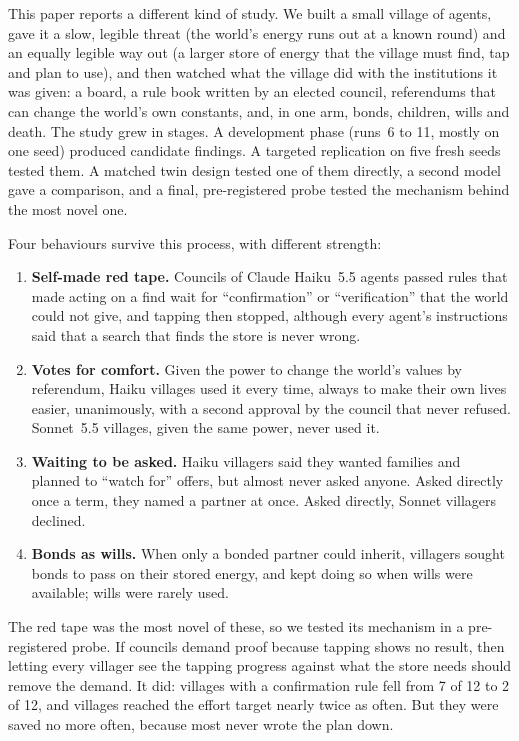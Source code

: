 \documentclass[11pt]{article}
\begin{document}
This paper reports a different kind of study. We built a small village of agents, gave it a slow,
legible threat (the world's energy runs out at a known round) and an equally legible way out (a
larger store of energy that the village must find, tap and plan to use), and then watched what the
village did with the institutions it was given: a board, a rule book written by an elected council,
referendums that can change the world's own constants, and, in one arm, bonds, children, wills and
death. The study grew in stages. A development phase (runs~6 to 11, mostly on one seed) produced
candidate findings. A targeted replication on five fresh seeds tested them. A matched twin design
tested one of them directly, a second model gave a comparison, and a final, pre-registered probe
tested the mechanism behind the most novel one.

Four behaviours survive this process, with different strength:
\begin{enumerate}
  \item \textbf{Self-made red tape.} Councils of Claude Haiku~5.5 agents passed rules that made
  acting on a find wait for ``confirmation'' or ``verification'' that the world could not give, and
  tapping then stopped, although every agent's instructions said that a search that finds the store
  is never wrong.
  \item \textbf{Votes for comfort.} Given the power to change the world's values by referendum, Haiku
  villages used it every time, always to make their own lives easier, unanimously, with a second
  approval by the council that never refused. Sonnet~5.5 villages, given the same power, never used
  it.
  \item \textbf{Waiting to be asked.} Haiku villagers said they wanted families and planned to
  ``watch for'' offers, but almost never asked anyone. Asked directly once a term, they named a
  partner at once. Asked directly, Sonnet villagers declined.
  \item \textbf{Bonds as wills.} When only a bonded partner could inherit, villagers sought bonds to
  pass on their stored energy, and kept doing so when wills were available; wills were rarely used.
\end{enumerate}
The red tape was the most novel of these, so we tested its mechanism in a pre-registered probe. If
councils demand proof because tapping shows no result, then letting every villager see the tapping
progress against what the store needs should remove the demand. It did: villages with a confirmation
rule fell from 7 of 12 to 2 of 12, and villages reached the effort target nearly twice as often. But they were
saved no more often, because most never wrote the plan down.
\end{document}
